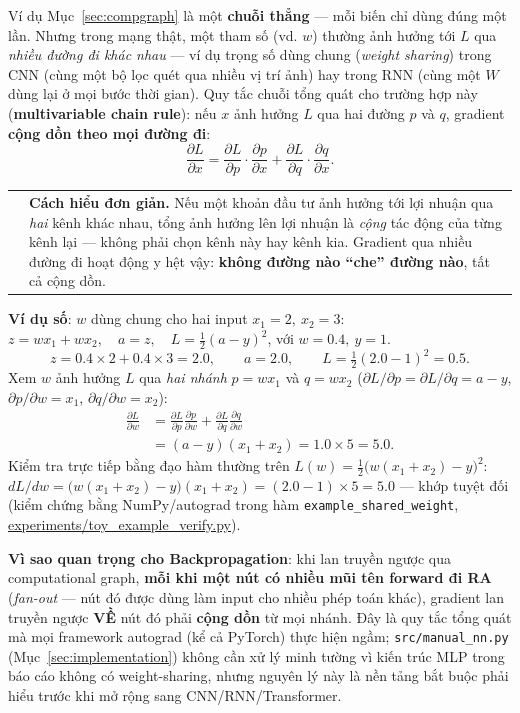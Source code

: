 \documentclass[12pt,a4paper]{article}
\makeatletter
\newenvironment{tructiep}[1][Cách hiểu đơn giản]
  {\par\smallskip\noindent\begin{tabular}{@{}p{0.35em}@{\hspace{6pt}}p{\dimexpr\linewidth-1.9em\relax}@{}}
   \textcolor{boxln}{\rule{2pt}{\baselineskip}} & \textbf{#1.}\enspace\ignorespaces}
  {\end{tabular}\par\smallskip}
\newcommand{\en}[1]{\textit{#1}}
\makeatother
\begin{document}
Ví dụ Mục~\ref{sec:compgraph} là một \textbf{chuỗi thẳng} --- mỗi biến chỉ
dùng đúng một lần. Nhưng trong mạng thật, một tham số (vd. $w$) thường ảnh
hưởng tới $L$ qua \emph{nhiều đường đi khác nhau} --- ví dụ trọng số dùng
chung (\en{weight sharing}) trong CNN (cùng một bộ lọc quét qua nhiều vị
trí ảnh) hay trong RNN (cùng một $W$ dùng lại ở mọi bước thời gian). Quy
tắc chuỗi tổng quát cho trường hợp này (\textbf{multivariable chain
rule}): nếu $x$ ảnh hưởng $L$ qua hai đường $p$ và $q$, gradient
\textbf{cộng dồn theo mọi đường đi}:
$$\frac{\partial L}{\partial x} = \frac{\partial L}{\partial p}\cdot\frac{\partial p}{\partial x} + \frac{\partial L}{\partial q}\cdot\frac{\partial q}{\partial x}.$$

\begin{tructiep}
Nếu một khoản đầu tư ảnh hưởng tới lợi nhuận qua \emph{hai} kênh khác
nhau, tổng ảnh hưởng lên lợi nhuận là \emph{cộng} tác động của từng kênh
lại --- không phải chọn kênh này hay kênh kia. Gradient qua nhiều đường đi
hoạt động y hệt vậy: \textbf{không đường nào ``che'' đường nào}, tất cả cộng
dồn.
\end{tructiep}

\textbf{Ví dụ số}: $w$ dùng chung cho hai input $x_1=2,\ x_2=3$:
$z = w x_1 + w x_2,\quad a=z,\quad L=\tfrac12(a-y)^2$, với $w=0.4,\ y=1$.
$$z = 0.4\times2 + 0.4\times3 = 2.0,\qquad a=2.0,\qquad L=\tfrac12(2.0-1)^2=0.5.$$
Xem $w$ ảnh hưởng $L$ qua \emph{hai nhánh} $p=wx_1$ và $q=wx_2$
($\partial L/\partial p=\partial L/\partial q=a-y$, $\partial p/\partial w=x_1$,
$\partial q/\partial w=x_2$):
\begin{align*}
\frac{\partial L}{\partial w} &= \frac{\partial L}{\partial p}\frac{\partial p}{\partial w} + \frac{\partial L}{\partial q}\frac{\partial q}{\partial w}\\
&= (a-y)(x_1+x_2) = 1.0\times5 = 5.0.
\end{align*}
Kiểm tra trực tiếp bằng đạo hàm thường trên $L(w)=\tfrac12\big(w(x_1{+}x_2)-y\big)^2$:
$dL/dw = \big(w(x_1{+}x_2)-y\big)(x_1{+}x_2) = (2.0-1)\times5=5.0$ --- khớp
tuyệt đối (kiểm chứng bằng NumPy/autograd trong hàm
\texttt{example\_shared\_weight}, \url{experiments/toy_example_verify.py}).

\textbf{Vì sao quan trọng cho Backpropagation}: khi lan truyền ngược qua
computational graph, \textbf{mỗi khi một nút có nhiều mũi tên forward đi
RA} (\en{fan-out} --- nút đó được dùng làm input cho nhiều phép toán
khác), gradient lan truyền ngược \textbf{VỀ} nút đó phải \textbf{cộng dồn}
từ mọi nhánh. Đây là quy tắc tổng quát mà mọi framework autograd (kể cả
PyTorch) thực hiện ngầm; \texttt{src/manual\_nn.py} (Mục~\ref{sec:implementation})
không cần xử lý minh tường vì kiến trúc MLP trong báo cáo không có
weight-sharing, nhưng nguyên lý này là nền tảng bắt buộc phải hiểu trước
khi mở rộng sang CNN/RNN/Transformer.
\end{document}
